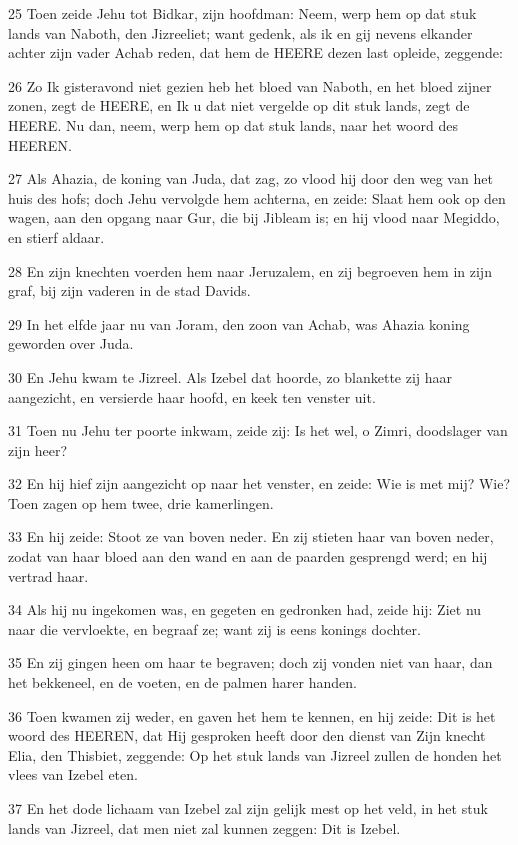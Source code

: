 \par 25 Toen zeide Jehu tot Bidkar, zijn hoofdman: Neem, werp hem op dat stuk lands van Naboth, den Jizreeliet; want gedenk, als ik en gij nevens elkander achter zijn vader Achab reden, dat hem de HEERE dezen last opleide, zeggende:
\par 26 Zo Ik gisteravond niet gezien heb het bloed van Naboth, en het bloed zijner zonen, zegt de HEERE, en Ik u dat niet vergelde op dit stuk lands, zegt de HEERE. Nu dan, neem, werp hem op dat stuk lands, naar het woord des HEEREN.
\par 27 Als Ahazia, de koning van Juda, dat zag, zo vlood hij door den weg van het huis des hofs; doch Jehu vervolgde hem achterna, en zeide: Slaat hem ook op den wagen, aan den opgang naar Gur, die bij Jibleam is; en hij vlood naar Megiddo, en stierf aldaar.
\par 28 En zijn knechten voerden hem naar Jeruzalem, en zij begroeven hem in zijn graf, bij zijn vaderen in de stad Davids.
\par 29 In het elfde jaar nu van Joram, den zoon van Achab, was Ahazia koning geworden over Juda.
\par 30 En Jehu kwam te Jizreel. Als Izebel dat hoorde, zo blankette zij haar aangezicht, en versierde haar hoofd, en keek ten venster uit.
\par 31 Toen nu Jehu ter poorte inkwam, zeide zij: Is het wel, o Zimri, doodslager van zijn heer?
\par 32 En hij hief zijn aangezicht op naar het venster, en zeide: Wie is met mij? Wie? Toen zagen op hem twee, drie kamerlingen.
\par 33 En hij zeide: Stoot ze van boven neder. En zij stieten haar van boven neder, zodat van haar bloed aan den wand en aan de paarden gesprengd werd; en hij vertrad haar.
\par 34 Als hij nu ingekomen was, en gegeten en gedronken had, zeide hij: Ziet nu naar die vervloekte, en begraaf ze; want zij is eens konings dochter.
\par 35 En zij gingen heen om haar te begraven; doch zij vonden niet van haar, dan het bekkeneel, en de voeten, en de palmen harer handen.
\par 36 Toen kwamen zij weder, en gaven het hem te kennen, en hij zeide: Dit is het woord des HEEREN, dat Hij gesproken heeft door den dienst van Zijn knecht Elia, den Thisbiet, zeggende: Op het stuk lands van Jizreel zullen de honden het vlees van Izebel eten.
\par 37 En het dode lichaam van Izebel zal zijn gelijk mest op het veld, in het stuk lands van Jizreel, dat men niet zal kunnen zeggen: Dit is Izebel.

